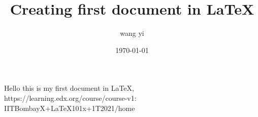 \documentclass{article}
\title{Creating first document in \LaTeX}
\author{wang yi}
\date{\today}
\begin{document}
    \maketitle
    \paragraph{}
\Large
Hello this is  my first document in LaTeX,\\
https://learning.edx.org/course/course-v1:\\ 
IITBombayX+LaTeX101x+1T2021/home
\end{document}

